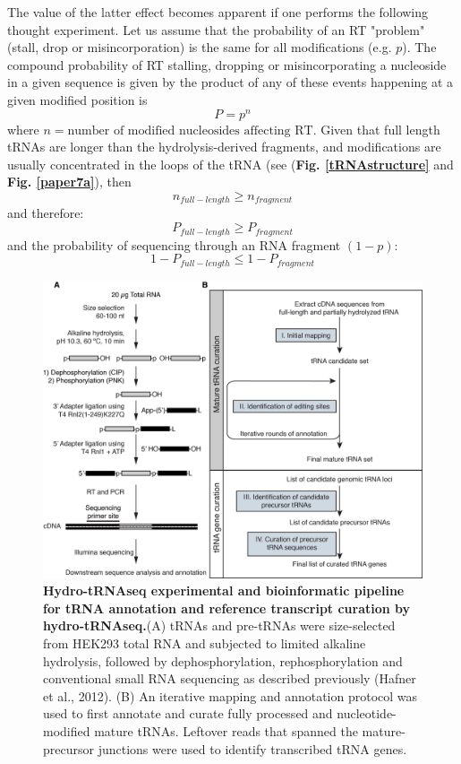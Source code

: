 \documentclass[12pt]{rockefeller}
\begin{document}
The value of the latter effect becomes apparent if one performs the following thought experiment. Let us assume that the probability of an RT "problem" (stall, drop or misincorporation) is the same for all modifications (e.g. $p$). The compound probability of RT stalling, dropping or misincorporating a nucleoside in a given sequence is given by the product of any of these events happening at a given modified position is 
\begin{equation}
P = p^n
\end{equation}
where  $n = \text{number of modified nucleosides affecting RT}$. 
Given that full length tRNAs are longer than the hydrolysis-derived fragments, and modifications are usually concentrated in the loops of the tRNA (see (\textbf{Fig. \ref{tRNAstructure}} and \textbf{Fig. \ref{paper7a}}), then 
\begin{equation}
n_{full-length} \geq n_{fragment} 
\end{equation}
and therefore: 
\begin{equation}
P_{full-length} \geq P_{fragment}
\end{equation}
and the probability of sequencing through an RNA fragment $(1-p)$:
\begin{equation}
1-P_{full-length} \leq 1-P_{fragment}
\end{equation}

\begin{figure}[!h]%
\centering
\includegraphics[width=\textwidth]{paper1.png}%
\caption[hydro-tRNAseq experimental and bioinformatic pipeline]{\textbf{Hydro-tRNAseq experimental and bioinformatic pipeline for tRNA annotation and reference transcript curation by hydro-tRNAseq.}(A) tRNAs and pre-tRNAs were size-selected from HEK293 total RNA and subjected to limited alkaline hydrolysis, followed by dephosphorylation, rephosphorylation and conventional small RNA sequencing as described previously (Hafner et al., 2012). (B) An iterative mapping and annotation protocol was used to first annotate and curate fully processed and nucleotide-modified mature tRNAs. Leftover reads that spanned the mature-precursor junctions were used to identify transcribed tRNA genes.}
\centering
\label{paper1}%
\end{figure}
\end{document}
